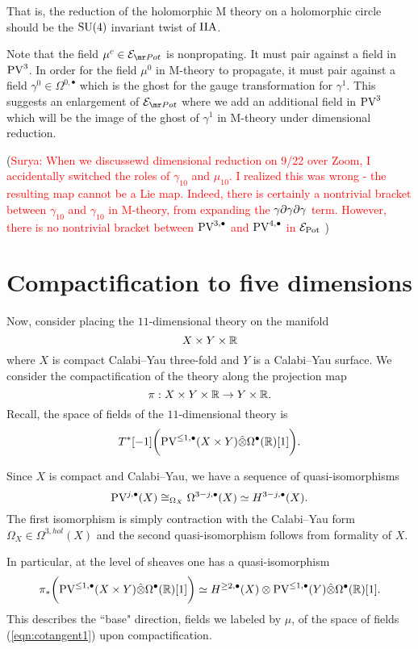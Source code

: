 \documentclass[11pt]{article}
\newcommand{\surya}[1]{(\textcolor{red}{Surya: #1})}
\newcommand\bu{\bullet}
\begin{document}
That is, the reduction of the holomorphic M theory on a holomorphic circle should be the $\text{SU}(4)$ invariant twist of $\text{IIA}$.

\begin{rmk}
Note that the field $\mu^{c}\in \mc E_{\mr Pot}$ is nonpropating. It must pair against a field in $\text{PV}^{3}$. In order for the field $\mu^{0}$ in M-theory to propagate, it must pair against a field $\gamma^{0}\in \Omega^{0,\bullet}$ which is the ghost for the gauge transformation for $\gamma^{1}$. This suggests an enlargement of $\mc E_{\mr Pot}$ where we add an additional field in $\text{PV}^{3}$ which will be the image of the ghost of $\gamma^{1}$ in M-theory under dimensional reduction.
\end{rmk}

\surya{ When we discussewd dimensional reduction on 9/22 over Zoom, I accidentally switched the roles of $\gamma_{10}$ and $\mu_{10}$. I realized this was wrong - the resulting map cannot be a Lie map. Indeed, there is certainly a nontrivial bracket between $\gamma_{10}$ and $\gamma_{10}$ in M-theory, from expanding the $\gamma\partial\gamma\partial\gamma$ term. However, there is no nontrivial bracket between $\text{PV}^{3,\bullet}$ and $\text{PV}^{4,\bullet}$ in $\mathcal{E}_{\rm Pot}$ }

\section{Compactification to five dimensions} 

Now, consider placing the $11$-dimensional theory on the manifold
\[
X \times Y \times \mathbb{R} 
\]
where $X$ is compact Calabi--Yau three-fold and $Y$ is a Calabi--Yau surface.
We consider the compactification of the theory along the projection map 
\[
\pi : X \times Y \times \mathbb{R} \to Y \times \mathbb{R} .
\]
Recall, the space of fields of the $11$-dimensional theory is
\begin{equation}\label{eqn:cotangent1}
T^* [-1] \bigg(\PV^{\leq 1,\bu}(X \times Y) \Hat{\otimes} \Omega^\bu(\mb R) [1] \bigg) .
\end{equation}

Since $X$ is compact and Calabi--Yau, we have a sequence of quasi-isomorphisms 
\[
\PV^{j, \bu}(X) \cong_{\Omega_X} \Omega^{3-j, \bu} (X) \simeq H^{3-j, \bu}(X) .
\]
The first isomorphism is simply contraction with the Calabi--Yau form $\Omega_X \in \Omega^{3,hol}(X)$ and the second quasi-isomorphism follows from formality of $X$. 

In particular, at the level of sheaves one has a quasi-isomorphism
\[
\pi_* \bigg(\PV^{\leq 1,\bu}(X \times Y) \Hat{\otimes} \Omega^\bu(\mb R) [1] \bigg) \simeq H^{\geq 2, \bu}(X) \otimes \PV^{\leq 1, \bu} (Y) \Hat{\otimes} \Omega^\bu (\mb R) [1] .
\]
This describes the ``base" direction, fields we labeled by $\mu$, of the space of fields (\ref{eqn:cotangent1}) upon compactification. 
\end{document}
